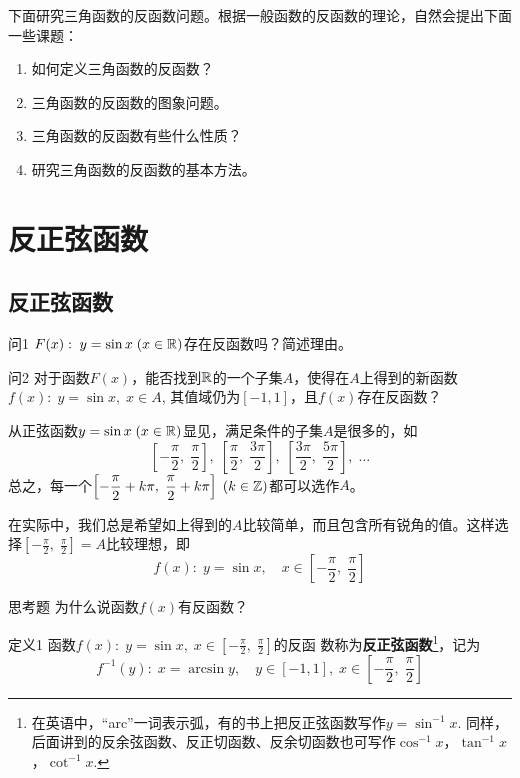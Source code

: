 下面研究三角函数的反函数问题。根据一般函数的反函数的理论，自然会提出下面一些课题：
\begin{enumerate}[(1)]
\item 如何定义三角函数的反函数？
\item 三角函数的反函数的图象问题。
\item 三角函数的反函数有些什么性质？
\item 研究三角函数的反函数的基本方法。
\end{enumerate}

\section{反正弦函数}
\subsection{反正弦函数}

\begin{thm}
    {问1} $F(x):\; y=\sin x\; (x\in\mathbb{R})$存在反函数吗？简述理由。
\end{thm}

\begin{thm}
{问2} 对于函数$F(x)$，能否找到$\mathbb{R}$的一个子集$A$，使得在$A$上得到的新函数
$f(x):\; y=\sin x,\; x\in A$, 其值域仍为$[-1,1]$，且$f(x)$存在反函数？    
\end{thm}

\begin{analyze}
 从正弦函数$y=\sin x\; (x\in\mathbb{R})$显见，满足条件的子集$A$是很多的，如
\[\left[-\frac{\pi}{2},\; \frac{\pi}{2}\right],\; \left[\frac{\pi}{2},\; \frac{3\pi}{2}\right],\; \left[\frac{3\pi}{2},\; \frac{5\pi}{2}\right],\; \ldots\]
 总之，每一个$\left[-\dfrac{\pi}{2}+k\pi,\; \dfrac{\pi}{2}+k\pi\right]\; (k\in\mathbb{Z})$都可以选作$A$。
\end{analyze}

在实际中，我们总是希望如上得到的$A$比较简单，而且包含所有锐角的值。这样选择$\left[-\frac{\pi}{2},\; \frac{\pi}{2}\right]=A$比较理想，即
\[f(x):\; y=\sin x,\quad x\in \left[-\frac{\pi}{2},\; \frac{\pi}{2}\right]\] 

\begin{thm}
    {思考题} 为什么说函数$f(x)$有反函数？
\end{thm}

\begin{thm}
{定义1} 函数$f(x):\; y=\sin x, \; x\in\left[-\frac{\pi}{2},\; \frac{\pi}{2}\right]$的反函
数称为\textbf{反正弦函数}\footnote{在英语中，“arc”一词表示弧，有的书上把反正弦函数写作$y=\sin^{-1}x$. 同样，后面讲到的反余弦函数、反正切函数、反余切函数也可写作$\cos^{-1}x$，$\tan^{-1}x$，$\cot^{-1} x$.}，记为
\[f^{-1}(y):\; x=\arcsin y,\quad y\in[-1,1],\; x\in \left[-\frac{\pi}{2},\; \frac{\pi}{2}\right]\]    
\end{thm}

